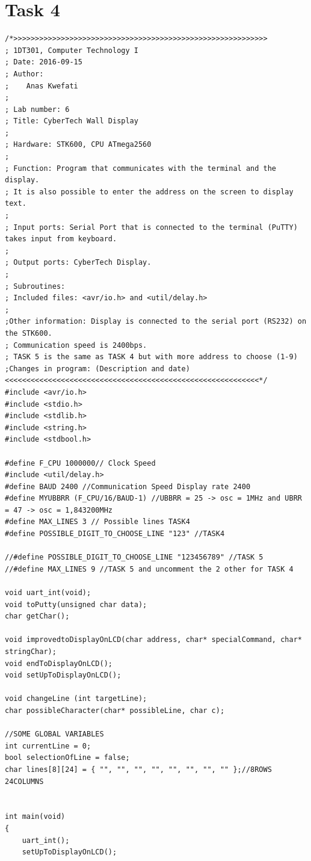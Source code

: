 \documentclass[a4paper,12pt]{article}
\begin{document}
\break

\section{Task 4}

\lstset{style=CStyle}

\begin{lstlisting}[style=CStyle]
/*>>>>>>>>>>>>>>>>>>>>>>>>>>>>>>>>>>>>>>>>>>>>>>>>>>>>>>>>>>>
; 1DT301, Computer Technology I
; Date: 2016-09-15
; Author:
;    Anas Kwefati
;
; Lab number: 6
; Title: CyberTech Wall Display
;
; Hardware: STK600, CPU ATmega2560
;
; Function: Program that communicates with the terminal and the display.
; It is also possible to enter the address on the screen to display text.
;
; Input ports: Serial Port that is connected to the terminal (PuTTY) takes input from keyboard.
;
; Output ports: CyberTech Display.
;
; Subroutines:
; Included files: <avr/io.h> and <util/delay.h>
;
;Other information: Display is connected to the serial port (RS232) on the STK600.
; Communication speed is 2400bps.
; TASK 5 is the same as TASK 4 but with more address to choose (1-9)
;Changes in program: (Description and date)
<<<<<<<<<<<<<<<<<<<<<<<<<<<<<<<<<<<<<<<<<<<<<<<<<<<<<<<<<<<*/
#include <avr/io.h>
#include <stdio.h>
#include <stdlib.h>
#include <string.h>
#include <stdbool.h>

#define F_CPU 1000000// Clock Speed
#include <util/delay.h>
#define BAUD 2400 //Communication Speed Display rate 2400
#define MYUBBRR (F_CPU/16/BAUD-1) //UBBRR = 25 -> osc = 1MHz and UBRR = 47 -> osc = 1,843200MHz
#define MAX_LINES 3 // Possible lines TASK4
#define POSSIBLE_DIGIT_TO_CHOOSE_LINE "123" //TASK4

//#define POSSIBLE_DIGIT_TO_CHOOSE_LINE "123456789" //TASK 5
//#define MAX_LINES 9 //TASK 5 and uncomment the 2 other for TASK 4

void uart_int(void);
void toPutty(unsigned char data);
char getChar();

void improvedtoDisplayOnLCD(char address, char* specialCommand, char* stringChar);
void endToDisplayOnLCD();
void setUpToDisplayOnLCD();

void changeLine (int targetLine);
char possibleCharacter(char* possibleLine, char c);

//SOME GLOBAL VARIABLES
int currentLine = 0;
bool selectionOfLine = false;
char lines[8][24] = { "", "", "", "", "", "", "", "" };//8ROWS 24COLUMNS


int main(void)
{
    uart_int();
    setUpToDisplayOnLCD();
    

\end{lstlisting}
\end{document}
